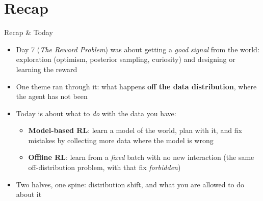 \section{Recap}
\begin{frame}{Recap \& Today}
\begin{itemize}
    \item Day 7 (\emph{The Reward Problem}) was about getting a \emph{good signal}
          from the world: exploration (optimism, posterior sampling, curiosity)
          and designing or learning the reward
    \item One theme ran through it: what happens \textbf{off the data
          distribution}, where the agent has not been
    \item Today is about what to \emph{do} with the data you have:
    \begin{itemize}
        \item \textbf{Model-based RL}: learn a model of the world, plan with it,
              and fix mistakes by collecting more data where the model is wrong
        \item \textbf{Offline RL}: learn from a \emph{fixed} batch with no new
              interaction (the same off-distribution problem, with that fix
              \emph{forbidden})
    \end{itemize}
    \item Two halves, one spine: distribution shift, and what you are allowed to
          do about it
\end{itemize}
\end{frame}
